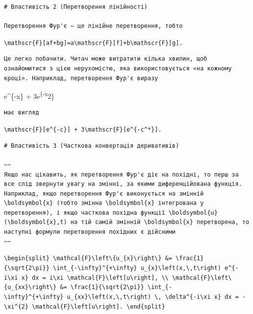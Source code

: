 \documentclass[
  ukrainian,
]{article}
\begin{document}
\begin{verbatim}
# Властивість 2 (Перетворення лінійності)

Перетворення Фур'є — це лінійне перетворення, тобто
\end{verbatim}

\texttt{\textbackslash{}mathscr\{F\}{[}af+bg{]}=a\textbackslash{}mathscr\{F\}{[}f{]}+b\textbackslash{}mathscr\{F\}{[}g{]}.}

\begin{verbatim}
Це легко побачити. Читач може витратити кілька хвилин, щоб ознайомитися з цією нерухомістю, яка використовується «на кожному кроці». Наприклад, перетворення Фур'є виразу
\end{verbatim}

e\^{}\{-x\} + 3e\textsuperscript{\{-x}2\}

\begin{verbatim}
має вигляд
\end{verbatim}

\texttt{\textbackslash{}mathscr\{F\}{[}e\^{}\{-c\}{]}\ +\ 3\textbackslash{}mathscr\{F\}{[}e\^{}\{-c\^{}*\}{]}.}

\begin{verbatim}
# Властивість 3 (Часткова конвертація деривативів)

~~
Якщо нас цікавить, як перетворення Фур'є діє на похідні, то перш за все слід звернути увагу на змінні, за якими диференційована функція. Наприклад, якщо перетворення Фур'є виконується на змінній \boldsymbol{x} (тобто змінна \boldsymbol{x} інтегрована у перетворення), і якщо часткова похідна функції \boldsymbol{u}(\boldsymbol{x},t) на тій самій змінній \boldsymbol{x} перетворена, то наступні формули перетворення похідних є дійсними
~~
\end{verbatim}

\texttt{\textbackslash{}begin\{split\}\ \textbackslash{}mathcal\{F\}\textbackslash{}left\textbackslash{}\{u\_\{x\}\textbackslash{}right\textbackslash{}\}\ \&=\ \textbackslash{}frac\{1\}\{\textbackslash{}sqrt\{2\textbackslash{}pi\}\}\ \textbackslash{}int\_\{-\textbackslash{}infty\}\^{}\{+\textbackslash{}infty\}\ u\_\{x\}\textbackslash{}left(x,\textbackslash{},t\textbackslash{}right)\ e\^{}\{-i\textbackslash{}xi\ x\}\ dx\ =\ i\textbackslash{}xi\ \textbackslash{}mathcal\{F\}\textbackslash{}left{[}u\textbackslash{}right{]},\ \textbackslash{}\textbackslash{}\ \textbackslash{}mathcal\{F\}\textbackslash{}left\textbackslash{}\{u\_\{xx\}\textbackslash{}right\textbackslash{}\}\ \&=\ \textbackslash{}frac\{1\}\{\textbackslash{}sqrt\{2\textbackslash{}pi\}\}\ \textbackslash{}int\_\{-\textbackslash{}infty\}\^{}\{+\textbackslash{}infty\}\ u\_\{xx\}\textbackslash{}left(x,\textbackslash{},t\textbackslash{}right)\ \textbackslash{},\ \textbackslash{}delta\^{}\{-i\textbackslash{}xi\ x\}\ dx\ =\ -\textbackslash{}xi\^{}\{2\}\ \textbackslash{}mathcal\{F\}\textbackslash{}left{[}u\textbackslash{}right{]}.\ \textbackslash{}end\{split\}}
\end{document}
